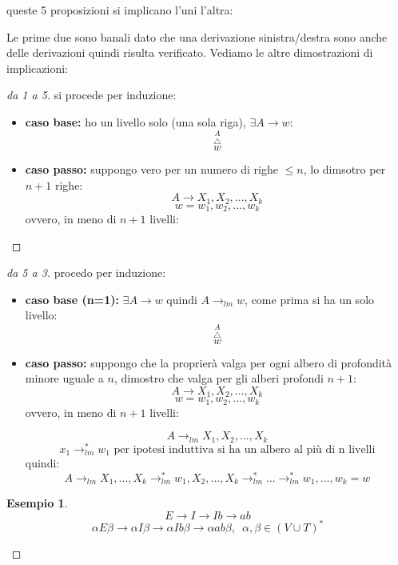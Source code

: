 \documentclass[a4paper]{book}
\theoremstyle{definition}%
\newtheorem*{esempio}{Esempio}
\begin{document}
queste 5 proposizioni si implicano l'uni l'altra:
\begin{center}
\end{center}
Le prime due sono banali dato che una derivazione sinistra/destra sono anche delle derivazioni quindi risulta verificato.
Vediamo le altre dimostrazioni di implicazioni:
\begin{proof}[da 1 a 5]
si procede per induzione:
\begin{itemize}
\item \textbf{caso base:} ho un livello solo (una sola riga), $\exists A\to w$:
$$\overset{A}{\overset{\triangle}w}$$
\item \textbf{caso passo:} suppongo vero per un numero di righe $\leq n$, lo dimsotro per $n+1$ righe:
$$A\to X_1,X_2,...,X_k$$
$$w=w_1,w_2,...,w_k$$
ovvero, in meno di $n+1$ livelli:
\end{itemize}
\end{proof}
\begin{proof}[da 5 a 3]
procedo per induzione:
\begin{itemize}
\item \textbf{caso base (n=1): }$\exists A\to w\mbox{ quindi } A\to_{lm}w$, come prima si ha un solo livello:
$$\overset{A}{\overset{\triangle}w}$$
\item \textbf{caso passo: }suppongo che la proprierà valga per ogni albero di profondità minore uguale a $n$, dimostro che valga per gli alberi profondi $n+1$:
$$A\to X_1,X_2,...,X_k$$
$$w=w_1,w_2,...,w_k$$
ovvero, in meno di $n+1$ livelli:
\begin{center}

\end{center}
$$A\to_{lm} X_1,X_2,...,X_k$$
$$x_1\to^*_{lm}w_1 \mbox{ per ipotesi induttiva si ha un albero al più di n livelli}$$
quindi:
$$A\to_{lm}X_1,...,X_k\to^*_{lm}w_1,X_2,...,X_k\to^*_{lm}...\to^*_{lm}w_1,...,w_k=w$$
\end{itemize}
\begin{esempio}
$$E\to I\to Ib\to ab$$
$$\alpha E\beta\to\alpha I\beta\to \alpha Ib\beta\to \alpha ab\beta,\,\,\,\alpha,\beta\in(V\cup T)^*$$
\end{esempio}
\end{proof}
\end{document}
